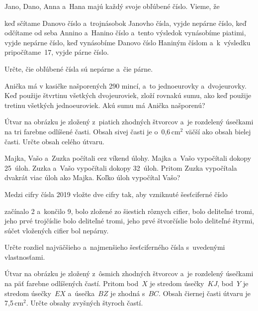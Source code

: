 {%
Jano, Dano, Anna a~Hana majú každý svoje obľúbené číslo. Vieme, že
\begin{itemize}
\itemitem{$\bullet$} keď sčítame Danovo číslo a~trojnásobok Janovho čísla, vyjde nepárne číslo,
\itemitem{$\bullet$} keď odčítame od seba Annino a~Hanino číslo a~tento výsledok vynásobíme piatimi, vyjde nepárne číslo,
\itemitem{$\bullet$} keď vynásobíme Danovo číslo Haniným číslom a~k~výsledku pripočítame~17, vyjde párne číslo.
\end{itemize}
Určte, čie obľúbené čísla sú nepárne a~čie párne.
}

{%
Anička má v kasičke našporených 290 mincí, a~to jednoeurovky a~dvojeurovky.
Keď použije štvrtinu všetkých dvojeuroviek, zloží rovnakú sumu, ako keď použije tretinu všetkých jednoeuroviek.
Akú sumu má Anička našporenú?
}

{%
Útvar na obrázku je zložený z~piatich zhodných štvorcov a~je rozdelený úsečkami na tri farebne odlíšené časti.
Obsah sivej časti je o~0,6\,cm$^2$ väčší ako obsah bielej časti.
Určte obsah celého útvaru.
\ifobrazkyvedla\else{}\fi%
}

{%
Majka, Vašo a~Zuzka počítali cez víkend úlohy.
Majka a~Vašo vypočítali dokopy 25~úloh.
Zuzka a~Vašo vypočítali dokopy 32~úloh.
Pritom Zuzka vypočítala dvakrát viac úloh ako Majka.
Koľko úloh vypočítal Vašo?
}

{%
Medzi cifry čísla 2019 vložte dve cifry tak, aby vzniknuté šesťciferné číslo
\begin{itemize}
\itemitem{$\bullet$} začínalo 2 a~končilo 9,
\itemitem{$\bullet$} bolo zložené zo šiestich rôznych cifier,
\itemitem{$\bullet$} bolo deliteľné tromi,
\itemitem{$\bullet$} jeho prvé trojčíslie bolo deliteľné tromi,
\itemitem{$\bullet$} jeho prvé štvorčíslie bolo deliteľné štyrmi,
\itemitem{$\bullet$} súčet vložených cifier bol nepárny.
\end{itemize}
Určte rozdiel najväčšieho a~najmenšieho šesťciferného čísla s~uvedenými vlastnosťami.}

{%
Útvar na obrázku je zložený z~ôsmich zhodných štvorcov a~je rozdelený úsečkami na päť farebne odlíšených častí.
Pritom bod~$X$ je stredom úsečky~$KJ$, bod~$Y$ je stredom úsečky~$EX$ a~úsečka~$BZ$ je zhodná s~$BC$.
Obsah čiernej časti útvaru je 7,5\,cm$^2$.
Určte obsahy zvyšných štyroch častí.
\ifobrazkyvedla\else{}\fi%
}

